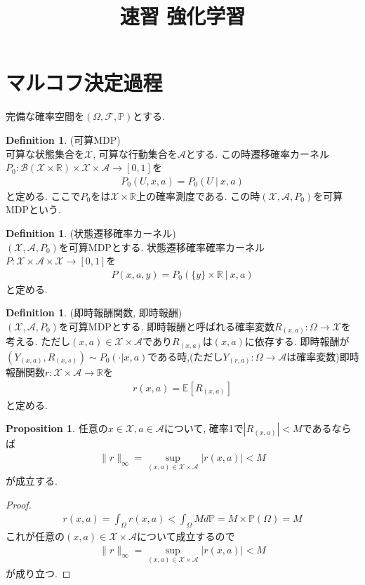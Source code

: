 \documentclass[11pt, a4paper, dvipdfmx]{jsarticle}
\title{速習 強化学習}
\author{}
\date{}
\theoremstyle{definition}
\newtheorem{Definition+}[Axiom+]{Definition}
\newtheorem{Proposition+}[Axiom+]{Proposition}
\newcommand{\R}{\mathbb{R}}
\newcommand{\X}{\mathcal{X}}
\newcommand{\A}{\mathcal{A}}
\newcommand{\Borel}{\mathcal{B}}
\newcommand{\E}{\mathbb{E}}
\renewcommand{\P}{\mathbb{P}}
\newcommand{\Prob}{(\Omega, \mathcal{F}, \P)}
\begin{document}
\maketitle
\section{マルコフ決定過程}
完備な確率空間を$\Prob$とする.
\begin{Definition+}(可算MDP)\\
    可算な状態集合を$\X$, 可算な行動集合を$\A$とする. この時遷移確率カーネル$P_{0}:\Borel(\X\times\R)\times\X\times\A\to [0, 1]$を
    \begin{align*}
        P_{0}(U, x, a) = P_{0}(U~|~x, a)
    \end{align*}
    と定める. ここで$P_{0}$をは$\X\times\R$上の確率測度である. この時$(\X, \A, P_{0})$を可算MDPという.
\end{Definition+}
\begin{Definition+}(状態遷移確率カーネル)\\
    $(\X, \A, P_{0})$を可算MDPとする. 状態遷移確率確率カーネル$P:\X\times\A\times\X\to [0, 1]$を
    \begin{align*}
        P(x, a, y) = P_{0}(\{y\}\times\R~|~x, a)
    \end{align*}
    と定める.
\end{Definition+}    

\begin{Definition+}(即時報酬関数, 即時報酬)\\
    $(\X, \A, P_{0})$を可算MDPとする. 
    即時報酬と呼ばれる確率変数$R_{(x, a)}:\Omega\to\X$を考える. ただし$(x, a)\in\X\times\A$であり$R_{(x, a)}$は$(x, a)$に依存する.
    即時報酬が$(Y_{(x, a)}, R_{(x, s)})\sim P_{0}(\cdot|x, a)$である時,(ただし$Y_{(r, a)}:\Omega\to\A$は確率変数)即時報酬関数$r:\X\times\A\to\R$を   
    \begin{align*}
        r(x, a) = \E[R_{(x, a)}]
    \end{align*}    
    と定める.
\end{Definition+}

\begin{Proposition+}
    任意の$x\in\X, a\in\A$について, 確率1で$|R_{(x, a)}| < M$であるならば
    \begin{align*}
        \|r\|_{\infty} = \sup_{(x, a)\in\X\times\A}|r(x, a)|<M
    \end{align*}    
    が成立する.
    \begin{proof}
        \begin{align*}
            r(x, a) = \int_{\Omega}r(x, a) < \int_{\Omega}M d\P = M\times\P(\Omega) = M
        \end{align*}
        これが任意の$(x, a)\in\X\times\A$について成立するので
        \begin{align*}
            \|r\|_{\infty} = \sup_{(x, a)\in\X\times\A}|r(x, a)|<M
        \end{align*}    
        が成り立つ. 
    \end{proof}
\end{Proposition+}
\end{document}
